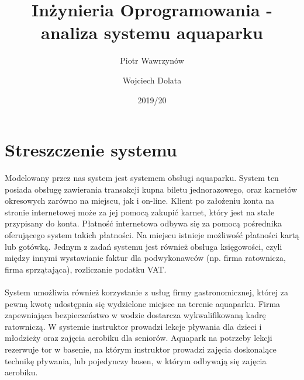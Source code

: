 \documentclass[a4paper,11pt]{article}
\title{Inżynieria Oprogramowania - analiza systemu aquaparku}
\date{2019/20}
\author{Piotr Wawrzynów \and Wojciech Dolata}
\begin{document}
\newcommand{\pspec}[4]{#1 \\wejście: #2 \\wyjście: #3 \\działanie: #4}

\maketitle
\newpage



\tableofcontents
\newpage


 
\section{Streszczenie systemu}
Modelowany przez nas system jest systemem obsługi aquaparku. System ten posiada obsługę zawierania transakcji kupna biletu jednorazowego, oraz karnetów okresowych zarówno na miejscu, jak i on-line. Klient po założeniu konta na stronie internetowej może za jej pomocą zakupić karnet, który jest na stałe przypisany do konta. Płatność internetowa odbywa się za pomocą pośrednika oferującego system takich płatności. Na miejscu istnieje możliwość płatności kartą lub gotówką. Jednym z zadań systemu jest również obsługa księgowości, czyli między innymi wystawianie faktur dla podwykonawców (np. firma ratownicza, firma sprzątająca), rozliczanie podatku VAT.\\ \\
System umożliwia również korzystanie z usług firmy gastronomicznej, której za pewną kwotę udostępnia się wydzielone miejsce na terenie aquaparku. Firma zapewniająca bezpieczeństwo w wodzie dostarcza wykwalifikowaną kadrę ratowniczą. W systemie instruktor prowadzi lekcje pływania dla dzieci i młodzieży oraz zajęcia aerobiku dla seniorów. Aquapark na potrzeby lekcji rezerwuje tor w basenie, na którym instruktor prowadzi zajęcia doskonalące technikę pływania, lub pojedynczy basen, w którym odbywają się zajęcia aerobiku.
\newpage
\end{document}
